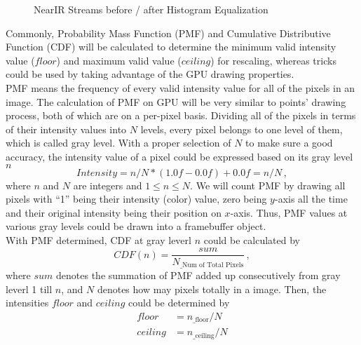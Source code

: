 %
 \begin{figure}[t]
\hspace*{-0.5cm}
\centering
{}
\caption{\gls{NearIR} Streams before / after Histogram Equalization}
\label{Histogram_Equalization}
\end{figure}%
%
Commonly, Probability Mass Function (PMF) and Cumulative Distributive Function (CDF) will be calculated to determine the minimum valid intensity value (\(floor\)) and maximum valid value (\(ceiling\)) for rescaling, whereas tricks could be used by taking advantage of the \gls{GPU} drawing properties.%
\\\indent%
PMF means the frequency of every valid intensity value for all of the pixels in an image. The calculation of PMF on \gls{GPU} will be very similar to points' drawing process, both of which are on a per-pixel basis. Dividing all of the pixels in terms of their intensity values into \(N\) levels, every pixel belongs to one level of them, which is called gray level. With a proper selection of \(N\) to make sure a good accuracy, the intensity value of a pixel could be expressed based on its gray level \(n\)
%
\begin{equation}
Intensity = n/N * (1.0f - 0.0f) + 0.0f = n/N \, ,
\end{equation}%
\noindent
where \(n\) and \(N\) are integers and \(1 \leqslant n \leqslant N\). We will count PMF by drawing all pixels with \enquote{1} being their intensity (color) value, zero being \(y\)-axis all the time and their original intensity being their position on \(x\)-axis. Thus, PMF values at various gray levels could be drawn into a framebuffer object.
\\\indent%
With PMF determined, CDF at gray leverl \(n\) could be calculated by
%
\begin{equation}
CDF(n) = \frac{sum}{N_{\text{\_Num of Total Pixels}}} \, ,
\end{equation}%
%
where \(sum\) denotes the summation of PMF added up consecutively from gray leverl 1 till \(n\), and \(N\) denotes how may pixels totally in a image. %
%
Then, the intensities \(floor\) and \(ceiling\) could be determined by 
%
\begin{equation}
\begin{aligned}
floor &=  n_{\text{\_floor}} / N%
\\%
ceiling &=  n_{\text{\_ceiling}} / N 
\end{aligned}
\label{intensityFloorCeilingDetermination}
\end{equation}%
